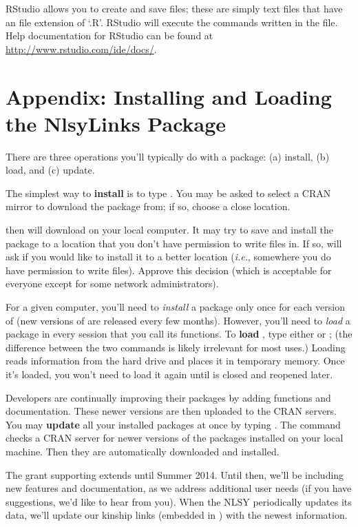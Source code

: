 \documentclass{article}\usepackage[]{graphicx}\usepackage[]{color}
\begin{document}
RStudio allows you to create and save \R{} files; these are simply text files
that have an file extension of `.R'.  RStudio will execute the commands written
in the file.  Help documentation for RStudio can be found at
\url{http://www.rstudio.com/ide/docs/}.

\section{Appendix: Installing and Loading the NlsyLinks Package} \label{sec:InstallingPackage}
There are three operations you'll typically do with a package: (a) install, (b) load, and (c) update.

The simplest way to \textbf{install}  is to type
.  You may be asked to select a CRAN
mirror to download the package from; if so, choose a close location.

\R{} then will download  on your local computer.  It may
try to save and install the package to a location that you don't have permission to
write files in.  If so, \R{} will ask if you would like to install it to a
better location (\emph{i.e.}, somewhere you do have permission to write files). 
Approve this decision (which is acceptable for everyone except for some network
administrators).

For a given computer, you'll need to \emph{install} a package only once for each
version of \R{} (new versions of \R{} are released every few months).  However, you'll need to \emph{load} a package in
every session that you call its functions.  To \textbf{load} ,
type either  or ; (the
difference between the two commands is likely irrelevant for most uses.) 
Loading reads  information from the hard drive and places it in
temporary memory.  Once it's loaded, you won't need to load it again until \R{}
is closed and reopened later.

Developers are continually improving their packages by adding functions and
documentation.  These newer versions are then uploaded to the CRAN servers.  You
may \textbf{update} all your installed packages at once by typing
.  The command checks a CRAN server for
newer versions of the packages installed on your local machine.  Then they are
automatically downloaded and installed. 

The grant supporting  extends until Summer 2014.  Until then,
we'll be including new features and documentation, as we address additional user
needs (if you have suggestions, we'd like to hear from you).  When the NLSY periodically updates its data, we'll
update our kinship links (embedded in ) with the newest information.
\end{document}
